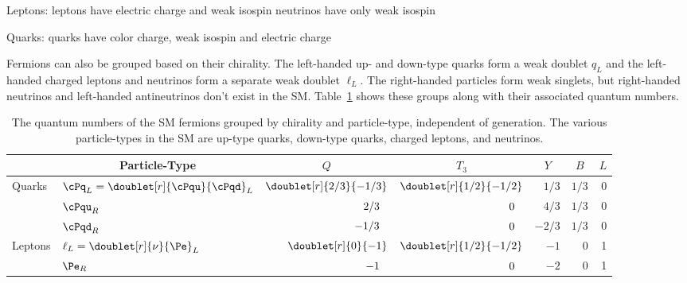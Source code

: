 Leptons:
leptons have electric charge and weak isospin
neutrinos have only weak isospin

Quarks:
quarks have color charge, weak isospin and electric charge



Fermions can also be grouped based on their chirality.
The left-handed up- and down-type quarks form a weak doublet $q_{L}$ and the left-handed charged leptons and neutrinos form a separate weak doublet $\ell_{L}$.
The right-handed particles form weak singlets, but right-handed neutrinos and left-handed antineutrinos don't exist in the SM.
Table~\ref{tab:fermion_quantum_numbers} shows these groups along with their associated quantum numbers.

\begin{table}[htbp]
	\caption{The quantum numbers of the SM fermions grouped by chirality and particle-type, independent of generation. The various particle-types in the SM are up-type quarks, down-type quarks, charged leptons, and neutrinos.}
	\centering
    \begin{tabular}{|l|l|r|r|r|r|r|}
\hline
      & \multicolumn{1}{c|}{Particle-Type} & \multicolumn{1}{c|}{$Q$} & \multicolumn{1}{c|}{$T_3$} & \multicolumn{1}{c|}{$Y$} & \multicolumn{1}{c|}{$B$} & \multicolumn{1}{c|}{$L$} \\
\hline
\multirow{3}{*}{Quarks}  
\rule{0pt}{24pt}         & $\cPq_L = \doublet[r]{\cPqu}{\cPqd}_L$ & $\doublet[r]{2/3}{-1/3}$ & $\doublet[r]{1/2}{-1/2}$ & $1/3$  & $1/3$ & 0 \\
                         & $\cPqu_R$                              & $2/3\hphantom{\bigg)}$   & $0\hphantom{\bigg)}$     & $4/3$  & $1/3$ & 0 \\
                         & $\cPqd_R$                              & $-1/3\hphantom{\bigg)}$  & $0\hphantom{\bigg)}$     & $-2/3$ & $1/3$ & 0 \\
\hline
\multirow{2}{*}{Leptons} 
\rule{0pt}{24pt}         & $\ell_L = \doublet[r]{\nu}{\Pe}_L$     & $\doublet[r]{0}{-1}$     & $\doublet[r]{1/2}{-1/2}$ & $-1$   & 0     & 1 \\
                         & $\Pe_R$                                & $-1\hphantom{\bigg)}$    & $0\hphantom{\bigg)}$     & $-2$   & 0     & 1 \\
\hline
    \end{tabular}
	\label{tab:fermion_quantum_numbers}
\end{table}


